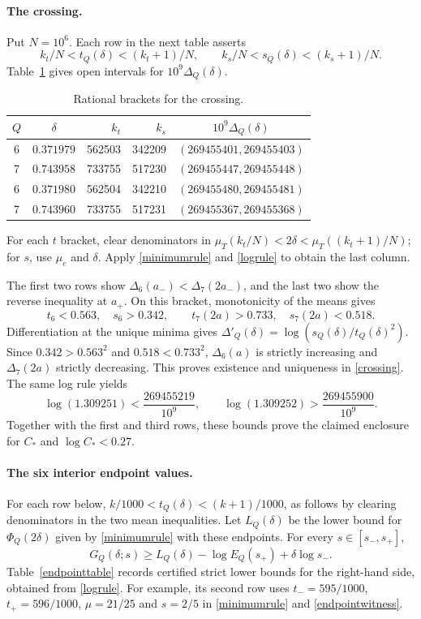 \documentclass[12pt,a4paper]{article}
\begin{document}
\paragraph{The crossing.}
Put $N=10^6$. Each row in the next table asserts
\[
k_t/N<t_Q(\delta)<(k_t+1)/N,\qquad
k_s/N<s_Q(\delta)<(k_s+1)/N.
\]
Table~\ref{crossingtable} gives open intervals for $10^9\Delta_Q(\delta)$.

\begin{table}[H]
\centering
\caption{Rational brackets for the crossing.}
\label{crossingtable}
\renewcommand{\arraystretch}{1.2}
\begin{tabular}{c c r r c}
\toprule
$Q$ & $\delta$ & $k_t$ & $k_s$ & $10^9\Delta_Q(\delta)$\\\midrule
6 & $0.371979$ & 562503 & 342209 & $(269455401,269455403)$\\
7 & $0.743958$ & 733755 & 517230 & $(269455447,269455448)$\\
6 & $0.371980$ & 562504 & 342210 & $(269455480,269455481)$\\
7 & $0.743960$ & 733755 & 517231 & $(269455367,269455368)$\\\bottomrule
\end{tabular}
\end{table}

For each $t$ bracket, clear denominators in
$\mu_T(k_t/N)<2\delta<\mu_T((k_t+1)/N)$; for $s$, use $\mu_e$ and $\delta$. Apply \eqref{minimumrule} and \eqref{logrule} to obtain the last column.

The first two rows show $\Delta_6(a_-)<\Delta_7(2a_-)$, and the last two show the reverse inequality at $a_+$. On this bracket, monotonicity of the means gives
\[
t_6<0.563,\quad s_6>0.342,\qquad
t_7(2a)>0.733,\quad s_7(2a)<0.518.
\]
Differentiation at the unique minima gives
$\Delta'_Q(\delta)=\log(s_Q(\delta)/t_Q(\delta)^2)$.
Since $0.342>0.563^2$ and $0.518<0.733^2$, $\Delta_6(a)$ is strictly increasing and $\Delta_7(2a)$ strictly decreasing. This proves existence and uniqueness in \eqref{crossing}. The same log rule yields
\[
\log(1.309251)<\frac{269455219}{10^9},\qquad
\log(1.309252)>\frac{269455900}{10^9}.
\]
Together with the first and third rows, these bounds prove the claimed enclosure for $C_*$ and $\log C_*<0.27$.

\paragraph{The six interior endpoint values.}
For each row below, $k/1000<t_Q(\delta)<(k+1)/1000$, as follows by clearing denominators in the two mean inequalities. Let $L_Q(\delta)$ be the lower bound for $\Phi_Q(2\delta)$ given by \eqref{minimumrule} with these endpoints. For every $s\in[s_-,s_+]$,
\begin{equation}\label{endpointwitness}
G_Q(\delta;s)\ge
L_Q(\delta)-\log E_Q(s_+)+\delta\log s_-.
\end{equation}
Table~\ref{endpointtable} records certified strict lower bounds for the right-hand side, obtained from \eqref{logrule}. For example, its second row uses $t_-=595/1000$, $t_+=596/1000$, $\mu=21/25$ and $s=2/5$ in \eqref{minimumrule} and \eqref{endpointwitness}.
\end{document}
